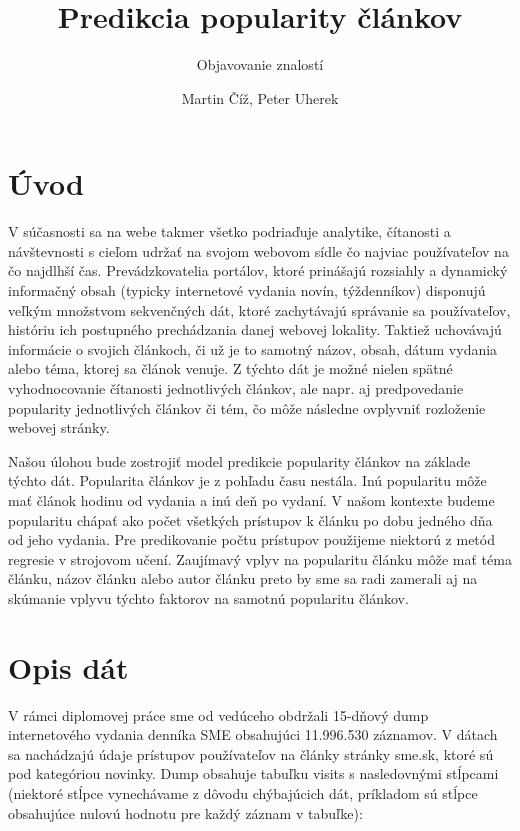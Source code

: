 \documentclass[runningheads,a4paper]{llncs}
\begin{document}
\title{Predikcia popularity článkov}
\subtitle{Objavovanie znalostí}
\author{Martin Číž, Peter Uherek}
\maketitle


\section{Úvod}

V súčasnosti sa na webe takmer všetko podriaďuje analytike, čítanosti a 
návštevnosti s cieľom udržať na svojom webovom sídle čo najviac používateľov na 
čo najdlhší čas. Prevádzkovatelia portálov, ktoré prinášajú rozsiahly a 
dynamický informačný obsah (typicky internetové vydania novín, týždenníkov) 
disponujú veľkým množstvom sekvenčných dát, ktoré zachytávajú správanie sa 
používateľov, históriu ich postupného prechádzania danej webovej lokality. 
Taktiež uchovávajú informácie o svojich článkoch, či už je to samotný názov, 
obsah, dátum vydania alebo téma, ktorej sa článok venuje. Z týchto dát je možné 
nielen spätné vyhodnocovanie čítanosti jednotlivých článkov, ale napr. aj 
predpovedanie popularity jednotlivých článkov či tém, čo môže následne ovplyvniť 
rozloženie webovej stránky. 


Našou úlohou bude zostrojiť model predikcie popularity článkov na základe týchto dát. Popularita článkov je z pohľadu času nestála. Inú popularitu môže mať článok hodinu od vydania a inú deň po vydaní. V našom kontexte budeme popularitu chápať ako počet všetkých prístupov k článku po dobu jedného dňa od jeho vydania. Pre predikovanie počtu prístupov použijeme niektorú z metód regresie v strojovom učení. Zaujímavý vplyv na popularitu článku môže mať téma článku, názov článku alebo autor článku preto by sme sa radi zamerali aj na skúmanie vplyvu týchto faktorov na samotnú popularitu článkov.



\section{Opis dát}
V rámci diplomovej práce sme od vedúceho obdržali 15-dňový dump 
internetového vydania denníka SME obsahujúci 11.996.530 záznamov. V dátach sa 
nachádzajú údaje prístupov používateľov na články stránky sme.sk, ktoré sú pod 
kategóriou novinky. Dump obsahuje tabuľku visits s nasledovnými stĺpcami 
(niektoré stĺpce vynechávame z dôvodu chýbajúcich dát, príkladom sú stĺpce 
obsahujúce nulovú hodnotu pre každý záznam v tabuľke):
\end{document}
